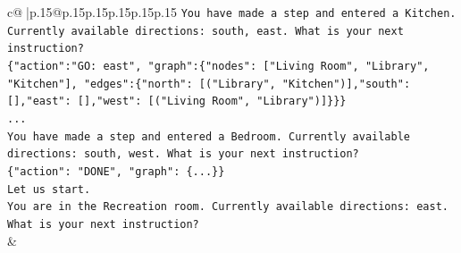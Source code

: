 \documentclass{article}
\begin{document}
{\begin{supertabular}{c@{$\;$}|p{.15\linewidth}@{}p{.15\linewidth}p{.15\linewidth}p{.15\linewidth}p{.15\linewidth}p{.15\linewidth}}
{{{\texttt{You have made a step and entered a Kitchen. Currently available directions: south, east. What is your next instruction?} \\
\texttt{\{"action":"GO: east", "graph":\{"nodes": {[}"Living Room", "Library", "Kitchen"{]}, "edges":\{"north": {[}("Library", "Kitchen"){]},"south": {[}{]},"east": {[}{]},"west": {[}("Living Room", "Library"){]}\}\}\}} \\
\texttt{...} \\
\texttt{You have made a step and entered a Bedroom. Currently available directions: south, west. What is your next instruction?} \\
\texttt{\{"action": "DONE", "graph": \{...\}\}} \\
\texttt{Let us start.} \\
\texttt{You are in the Recreation room. Currently available directions: east. What is your next instruction?} \\
            }
        }
    }
    & \\ \\


\end{supertabular}}
\end{document}
